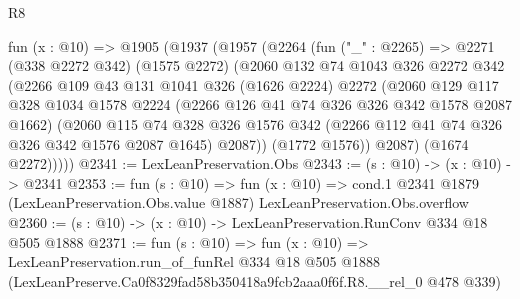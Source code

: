 \begin{lexlean}{R8}
\begin{coremodule}
  fun (x : @10) =>
  @1905
    (@1937
      (@1957
        (@2264
          (fun ("_" : @2265) =>
          @2271
            (@338 @2272 @342)
            (@1575 @2272)
            (@2060
              @132
              @74
              @1043
              @326
              @2272
              @342
              (@2266
                @109
                @43
                @131
                @1041
                @326
                (@1626 @2224)
                @2272
                (@2060
                  @129
                  @117
                  @328
                  @1034
                  @1578
                  @2224
                  (@2266 @126 @41 @74 @326 @326 @342 @1578 @2087 @1662)
                  (@2060
                    @115
                    @74
                    @328
                    @326
                    @1576
                    @342
                    (@2266 @112 @41 @74 @326 @326 @342 @1576 @2087 @1645)
                    @2087))
                (@1772 @1576))
              @2087)
            (@1674 @2272)))))
@2341 := LexLeanPreservation.Obs
@2343 := (s : @10) -> (x : @10) -> @2341
@2353 := fun (s : @10) =>
  fun (x : @10) =>
  cond.{1} @2341 @1879 (LexLeanPreservation.Obs.value @1887) LexLeanPreservation.Obs.overflow
@2360 := (s : @10) -> (x : @10) -> LexLeanPreservation.RunConv @334 @18 @505 @1888
@2371 := fun (s : @10) =>
  fun (x : @10) =>
  LexLeanPreservation.run_of_funRel
    @334
    @18
    @505
    @1888
    (LexLeanPreserve.Ca0f8329fad58b350418a9fcb2aaa0f6f.R8.__rel_0 @478 @339)
\end{coremodule}
\end{lexlean}
